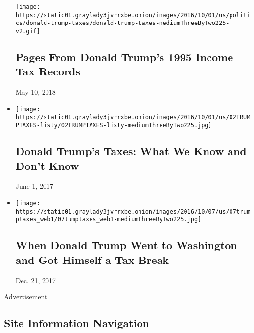 \begin{itemize}
  \texttt{[image: https://static01.graylady3jvrrxbe.onion/images/2016/10/01/us/politics/donald-trump-taxes/donald-trump-taxes-mediumThreeByTwo225-v2.gif]}

  \hypertarget{pages-from-donald-trumps-1995-income-tax-records}{%
  \subsection{Pages From Donald Trump's 1995 Income Tax
  Records}\label{pages-from-donald-trumps-1995-income-tax-records}}

  May 10, 2018
\item
  \href{https://www.nytimes3xbfgragh.onion/interactive/2016/us/politics/donald-trump-taxes-explained.html}{}

  \texttt{[image: https://static01.graylady3jvrrxbe.onion/images/2016/10/01/us/02TRUMPTAXES-listy/02TRUMPTAXES-listy-mediumThreeByTwo225.jpg]}

  \hypertarget{donald-trumps-taxes-what-we-know-and-dont-know}{%
  \subsection{Donald Trump's Taxes: What We Know and Don't
  Know}\label{donald-trumps-taxes-what-we-know-and-dont-know}}

  June 1, 2017
\item
  \href{https://www.nytimes3xbfgragh.onion/2016/10/07/us/politics/donald-trump-taxes.html}{}

  \texttt{[image: https://static01.graylady3jvrrxbe.onion/images/2016/10/07/us/07trumptaxes\_web1/07tumptaxes\_web1-mediumThreeByTwo225.jpg]}

  \hypertarget{when-donald-trump-went-to-washington-and-got-himself-a-tax-break}{%
  \subsection{When Donald Trump Went to Washington and Got Himself a Tax
  Break}\label{when-donald-trump-went-to-washington-and-got-himself-a-tax-break}}

  Dec. 21, 2017
\end{itemize}

Advertisement

\hypertarget{site-information-navigation}{%
\subsection{Site Information
Navigation}\label{site-information-navigation}}

